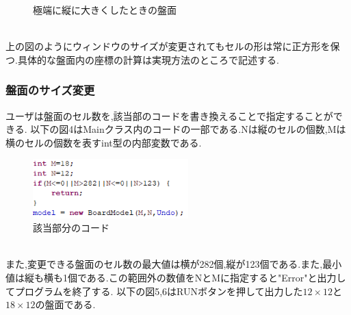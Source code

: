 \documentclass[dvipdfmx]{jarticle}
\begin{document}
\begin{figure}[htbp]
\begin{minipage}[b]{0.45\linewidth}
      \caption{極端に縦に大きくしたときの盤面}
    \end{minipage}
  \end{figure}
  \\上の図のようにウィンドウのサイズが変更されてもセルの形は常に正方形を保つ.具体的な盤面内の座標の計算は実現方法のところで記述する.
\subsubsection{盤面のサイズ変更}
ユーザは盤面のセル数を,該当部のコードを書き換えることで指定することができる.
以下の図4はMainクラス内のコードの一部である.Nは縦のセルの個数,Mは横のセルの個数を表すint型の内部変数である.
\begin{figure}[h]
  \centering
  \includegraphics[width=6cm]{code_masu.png}
  \caption{該当部分のコード}
\end{figure}
\\また,変更できる盤面のセル数の最大値は横が282個,縦が123個である.また,最小値は縦も横も1個である.この範囲外の数値をNとMに指定すると"Error"と出力してプログラムを終了する.
以下の図5,6はRUNボタンを押して出力した$12\times12$と$18\times12$の盤面である.
\end{document}
